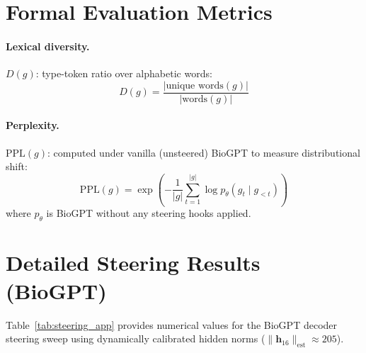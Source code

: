 \documentclass[11pt,a4paper]{article}
\begin{document}
\section{Formal Evaluation Metrics}
\label{app:eval_metrics}

\paragraph{Lexical diversity.}
$D(g)$: type-token ratio over alphabetic words:
\begin{equation}
D(g) = \frac{|\text{unique words}(g)|}{|\text{words}(g)|}
\end{equation}

\paragraph{Perplexity.}
$\mathrm{PPL}(g)$: computed under vanilla (unsteered) BioGPT to measure
distributional shift:
\begin{equation}
\mathrm{PPL}(g) = \exp\!\left(-\frac{1}{|g|}
\sum_{t=1}^{|g|}\log p_\theta(g_t \mid g_{<t})\right)
\end{equation}
where $p_\theta$ is BioGPT without any steering hooks applied.

\section{Detailed Steering Results (BioGPT)}
\label{app:steering_table}

Table~\ref{tab:steering_app} provides numerical values for the BioGPT
decoder steering sweep using dynamically calibrated hidden norms
($\|\mathbf{h}_{16}\|_{\text{est}} \approx 205$).
\end{document}
